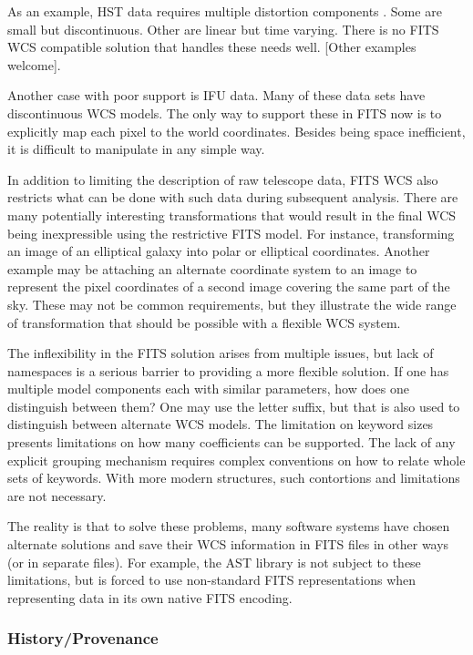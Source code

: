 \documentclass[final,authoryear,5p,times,twocolumn]{elsarticle}
\begin{document}
As an example, HST data requires multiple distortion components
\citep[see e.g.][]{2013ASPC..475...49H}. Some are small but
discontinuous. Other are linear but time varying. There is no FITS WCS
compatible solution that handles these needs well. [Other examples
welcome].


Another case with poor support is IFU data. Many of these data sets
have discontinuous WCS models. The only way to support these in FITS
now is to explicitly map each pixel to the world coordinates. Besides
being space inefficient, it is difficult to manipulate in any simple
way.


In addition to limiting the description of raw telescope data, FITS
WCS also restricts what can be done with such data during subsequent
analysis. There are many potentially interesting transformations that
would result in the final WCS being inexpressible using the
restrictive FITS model. For instance, transforming an image of an
elliptical galaxy into polar or elliptical coordinates. Another
example may be attaching an alternate coordinate system to an image to
represent the pixel coordinates of a second image covering the same
part of the sky. These may not be common requirements, but they
illustrate the wide range of transformation that should be possible
with a flexible WCS system.


The inflexibility in the FITS solution arises from multiple issues,
but lack of namespaces is a serious barrier to providing a more
flexible solution. If one has multiple model components each with
similar parameters, how does one distinguish between them? One may use
the letter suffix, but that is also used to distinguish between
alternate WCS models. The limitation on keyword sizes presents
limitations on how many coefficients can be supported. The lack of any
explicit grouping mechanism requires complex conventions on how to
relate whole sets of keywords. With more modern structures, such
contortions and limitations are not necessary.


The reality is that to solve these problems, many software systems
have chosen alternate solutions and save their WCS information in FITS
files in other ways (or in separate files). For example, the AST
library \citep{1998ASPC..145...41W,2012ASPC..461..825B} is not subject
to these limitations, but is forced to use non-standard FITS
representations when representing data in its own native FITS
encoding.


\subsubsection{History/Provenance}
\end{document}
